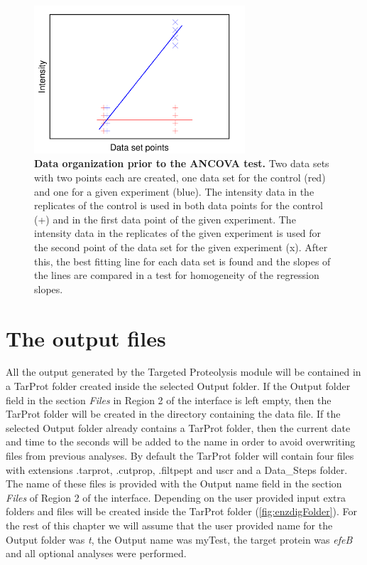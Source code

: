 \begin{figure}[h]
	\centering
	\includegraphics[width=0.7\textwidth]{./IMAGES/MOD-TARPROT/tarprot-ancova.png}	    
	\caption[Data organization prior to the ANCOVA test]{\textbf{Data organization prior to the ANCOVA test.} Two data sets with two points each are created, one data set for the control (red) and one for a given experiment (blue). The intensity data in the replicates of the control is used in both data points for the control (+) and in the first data point of the given experiment. The intensity data in the replicates of the given experiment is used for the second point of the data set for the given experiment (x). After this, the best fitting line for each data set is found and the slopes of the lines are compared in a test for homogeneity of the regression slopes.} 
	\label{fig:enzdigAncova}
	\vspace{-5pt} 	
\end{figure} 

\section{The output files}

All the output generated by the Targeted Proteolysis module will be contained in a TarProt folder created inside the selected Output folder. If the Output folder field in the section \textit{Files} in Region \num{2} of the interface is left empty, then the TarProt folder will be created in the directory containing the data file. If the selected Output folder already contains a TarProt folder, then the current date and time to the seconds will be added to the name in order to avoid overwriting files from previous analyses. By default the TarProt folder will contain four files with extensions .tarprot, .cutprop, .filtpept and uscr and a Data{\_}Steps folder. The name of these files is provided with the Output name field in the section \textit{Files} of Region \num{2} of the interface. Depending on the user provided input extra folders and files will be created inside the TarProt folder (\autoref{fig:enzdigFolder}). For the rest of this chapter we will assume that the user provided name for the Output folder was \textit{t}, the Output name was myTest, the target protein was \textit{efeB} and all optional analyses were performed.

